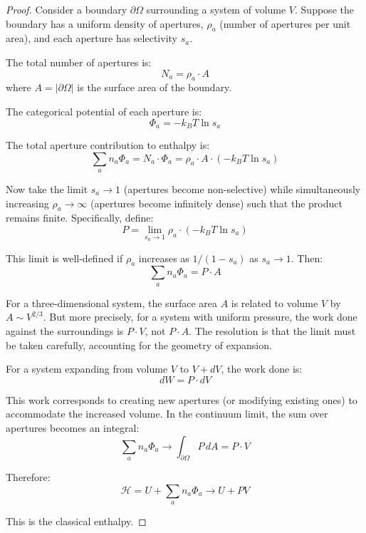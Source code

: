 \documentclass[12pt,a4paper]{article}
\theoremstyle{definition}
\theoremstyle{remark}
\begin{document}
\begin{proof}
Consider a boundary $\partial\Omega$ surrounding a system of volume $V$. Suppose the boundary has a uniform density of apertures, $\rho_a$ (number of apertures per unit area), and each aperture has selectivity $s_a$.

The total number of apertures is:
\begin{equation}
N_a = \rho_a \cdot A
\end{equation}
where $A = |\partial\Omega|$ is the surface area of the boundary.

The categorical potential of each aperture is:
\begin{equation}
\Phi_a = -k_B T \ln s_a
\end{equation}

The total aperture contribution to enthalpy is:
\begin{equation}
\sum_a n_a \Phi_a = N_a \cdot \Phi_a = \rho_a \cdot A \cdot (-k_B T \ln s_a)
\end{equation}

Now take the limit $s_a \to 1$ (apertures become non-selective) while simultaneously increasing $\rho_a \to \infty$ (apertures become infinitely dense) such that the product remains finite. Specifically, define:
\begin{equation}
P = \lim_{s_a \to 1} \rho_a \cdot (-k_B T \ln s_a)
\end{equation}

This limit is well-defined if $\rho_a$ increases as $1/(1 - s_a)$ as $s_a \to 1$. Then:
\begin{equation}
\sum_a n_a \Phi_a = P \cdot A
\end{equation}

For a three-dimensional system, the surface area $A$ is related to volume $V$ by $A \sim V^{2/3}$. But more precisely, for a system with uniform pressure, the work done against the surroundings is $P \cdot V$, not $P \cdot A$. The resolution is that the limit must be taken carefully, accounting for the geometry of expansion.

For a system expanding from volume $V$ to $V + dV$, the work done is:
\begin{equation}
dW = P \cdot dV
\end{equation}

This work corresponds to creating new apertures (or modifying existing ones) to accommodate the increased volume. In the continuum limit, the sum over apertures becomes an integral:
\begin{equation}
\sum_a n_a \Phi_a \to \int_{\partial\Omega} P \, dA = P \cdot V
\end{equation}

Therefore:
\begin{equation}
\mathcal{H} = U + \sum_a n_a \Phi_a \to U + PV
\end{equation}

This is the classical enthalpy.
\end{proof}
\end{document}
